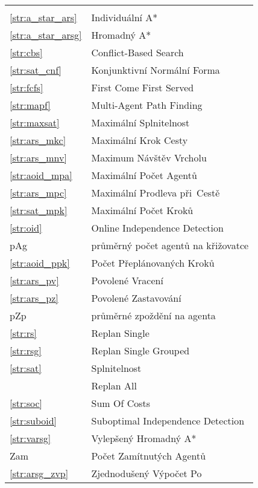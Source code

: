 \begin{table}[h!]
	\centering
	\begin{tabular}{l l}
		\midrule \\
		\ref{str:a_star_ars}    & Individuální A*                     \\
		\ref{str:a_star_arsg}   & Hromadný A*                         \\
		\ref{str:cbs}           & Conflict-Based Search               \\
		\ref{str:sat_cnf}       & Konjunktivní Normální Forma         \\
		\ref{str:fcfs}          & First Come First Served             \\
		\ref{str:mapf}          & Multi-Agent Path Finding            \\
		\ref{str:maxsat}        & Maximální Splnitelnost              \\
		\ref{str:ars_mkc}       & Maximální Krok Cesty                \\
		\ref{str:ars_mnv}       & Maximum Návštěv Vrcholu             \\
		\ref{str:aoid_mpa}      & Maximální Počet Agentů              \\
		\ref{str:ars_mpc}       & Maximální Prodleva při~Cestě        \\
		\ref{str:sat_mpk}       & Maximální Počet Kroků               \\
		\ref{str:oid}           & Online Independence Detection       \\
		pAg                     & průměrný počet agentů na křižovatce \\
		\ref{str:aoid_ppk}      & Počet Přeplánovaných Kroků          \\
		\ref{str:ars_pv}        & Povolené Vracení                    \\
		\ref{str:ars_pz}        & Povolené Zastavování                \\
		pZp                     & průměrné zpoždění na agenta         \\
		\ref{str:rs}            & Replan Single                       \\
		\ref{str:rsg}           & Replan Single Grouped               \\
		\ref{str:sat}           & Splnitelnost                        \\
		\nameref{subsec:sat_ra} & Replan All                          \\
		\ref{str:soc}           & Sum Of Costs                        \\
		\ref{str:suboid}        & Suboptimal Independence Detection   \\
		\ref{str:varsg}         & Vylepšený Hromadný A*               \\
		Zam                     & Počet Zamítnutých Agentů            \\
		\ref{str:arsg_zvp}      & Zjednodušený Výpočet Po             \\
	\end{tabular}\label{tab:seznam_zkratek}
\end{table}
